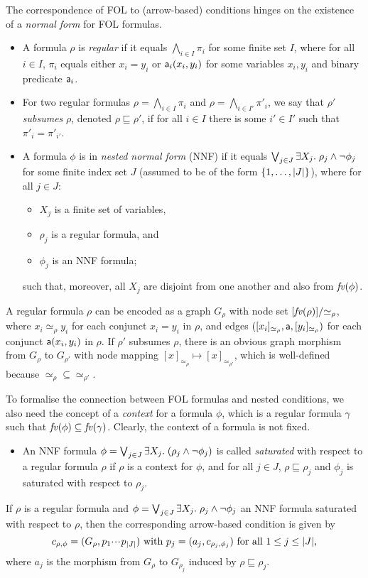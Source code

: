 The correspondence of FOL to (arrow-based) conditions hinges on the existence of a \emph{normal form} for FOL formulas.
%
\begin{itemize}
\item A formula $\rho$ is \emph{regular} if it equals $\bigwedge_{i\in I} \pi_i$ for some finite set $I$, where for all $i\in I$, $\pi_i$ equals either $x_i=y_i$ or $\mathsf{a}_i(x_i,y_i)$ for some variables $x_i,y_i$ and binary predicate $\mathsf{a}_i$.

\item For two regular formulas $\rho=\bigwedge_{i\in I} \pi_i$ and $\rho=\bigwedge_{i\in I'} \pi'_i$, we say that $\rho'$ \emph{subsumes} $\rho$, denoted $\rho\sqsubseteq \rho'$, if for all $i\in I$ there is some $i'\in I'$ such that $\pi'_i=\pi'_{i'}$.

\item A formula $\phi$ is in \emph{nested normal form} (NNF) if it equals $\bigvee_{j\in J} \exists X_j.\; \rho_j\wedge\neg \phi_j$ for some finite index set $J$ (assumed to be of the form $\{{1,\ldots,|J|}\}$), where for all $j\in J$:
\begin{itemize}
\item $X_j$ is a finite set of variables,
\item $\rho_j$ is a regular formula, and
\item $\phi_j$ is an NNF formula;
\end{itemize}
such that, moreover, all $X_j$ are disjoint from one another and also from $\mathit{fv}(\phi)$.
\end{itemize}
%
A regular formula $\rho$ can be encoded as a graph $G_\rho$ with node set $[\mathit{fv}(\rho)]/{\simeq_\rho}$, where $x_i\simeq_\rho y_i$ for each conjunct $x_i=y_i$ in $\rho$, and edges $([x_i]_{\simeq_\rho},\mathsf{a},[y_i]_{\simeq_\rho})$ for each conjunct $\mathsf{a}(x_i,y_i)$ in $\rho$. If $\rho'$ subsumes $\rho$, there is an obvious graph morphism from $G_\rho$ to $G_{\rho'}$ with node mapping $[x]_{\simeq_\rho}\mapsto [x]_{\simeq_{\rho'}}$, which is well-defined because ${\simeq_\rho}\subseteq {\simeq_{\rho'}}$.

To formalise the connection between FOL formulas and nested conditions, we also need the concept of a \emph{context} for a formula $\phi$, which is a regular formula $\gamma$ such that $\mathit{fv}(\phi)\subseteq \mathit{fv}(\gamma)$. Clearly, the context of a formula is not fixed.
%
\begin{itemize}
\item An NNF formula $\phi=\bigvee_{j\in J} \exists X_j.\; (\rho_j\wedge\neg \phi_j)$ is called \emph{saturated} with respect to a regular formula $\rho$ if $\rho$ is a context for $\phi$, and for all $j\in J$, $\rho\sqsubseteq \rho_j$ and $\phi_j$ is saturated with respect to $\rho_j$.
\end{itemize}
%
If $\rho$ is a regular formula and $\phi=\bigvee_{j\in J} \exists X_j.\; \rho_j\wedge\neg \phi_j$ an NNF formula saturated with respect to $\rho$, then the corresponding arrow-based condition is given by
\[ c_{\rho,\phi}=(G_\rho,p_1{\cdotp\mkern-2mu\cdotp\mkern-2mu\cdotp\mkern1mu} p_{|J|}) \text{ with } p_j=(a_j,c_{\rho_j,\phi_j}) \text{ for all $1\leq j\leq |J|$,}
\]
where $a_j$ is the morphism from $G_\rho$ to $G_{\rho_j}$ induced by $\rho\sqsubseteq \rho_j$.
